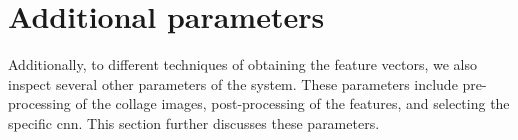 





\section{Additional parameters}

Additionally, to different techniques of obtaining the feature vectors, we also inspect several other parameters of the system. These parameters include pre-processing of the collage images, post-processing of the features, and selecting the specific \acrshort{cnn}. This section further discusses these parameters.

